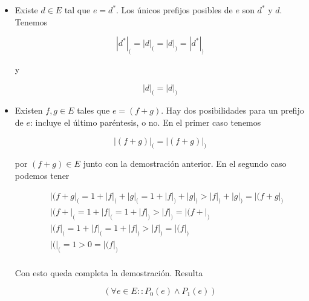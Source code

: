 \documentclass{article}
\begin{document}
\begin{itemize}

\item Existe $d \in E$ tal que $e = d^*$. Los únicos prefijos posibles de $e$
son $d^*$ y $d$. Tenemos

$$|d^*|_( = |d|_( = |d|_) = |d^*|_)$$

y

$$|d|_( = |d|_)$$

\item Existen $f,g \in E$ tales que $e = (f+g)$. Hay dos posibilidades para un
prefijo de $e$: incluye el último paréntesis, o no. En el primer caso tenemos

$$
|(f+g)|_( = |(f+g)|_)
$$

por $(f+g) \in E$ junto con la demostración anterior. En el segundo caso podemos
tener

\begin{eqnarray*}
& & |(f+g|_( = 1 + |f|_( + |g|_( = 1 + |f|_) + |g|_) > |f|_) + |g|_) = |(f+g|_) \\
& & |(f+|_( = 1 + |f|_( = 1 + |f|_) > |f|_) = |(f+|_) \\
& & |(f|_( = 1 + |f|_( = 1 + |f|_) > |f|_) = |(f|_) \\
& & |(|_( = 1 > 0 = |(f|_) \\
\end{eqnarray*}

Con esto queda completa la demostración. Resulta

$$(\forall e \in E :: P_0(e) \wedge P_1(e))$$

\end{itemize}

\section{}
\end{document}

